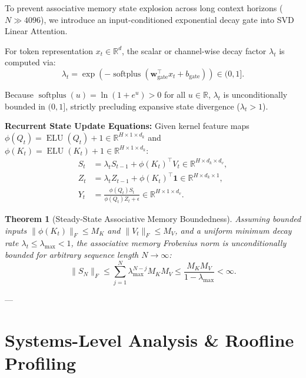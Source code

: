 \documentclass[10pt,twocolumn,letterpaper]{article}
\newtheorem{theorem}{Theorem}
\begin{document}
To prevent associative memory state explosion across long context horizons ($N \gg 4096$), we introduce an input-conditioned exponential decay gate into SVD Linear Attention.

For token representation $x_t \in \mathbb{R}^d$, the scalar or channel-wise decay factor $\lambda_t$ is computed via:
\begin{equation}
\label{eq:decay_gate}
\lambda_t = \exp\left(-\operatorname{softplus}\left(\mathbf{w}_{\text{gate}}^\top x_t + b_{\text{gate}}\right)\right) \in (0, 1].
\end{equation}

Because $\operatorname{softplus}(u) = \ln(1 + e^u) > 0$ for all $u \in \mathbb{R}$, $\lambda_t$ is unconditionally bounded in $(0, 1]$, strictly precluding expansive state divergence ($\lambda_t > 1$).

\textbf{Recurrent State Update Equations:}
Given kernel feature maps $\phi(Q_t) = \operatorname{ELU}(Q_t) + 1 \in \mathbb{R}^{H \times 1 \times d_k}$ and $\phi(K_t) = \operatorname{ELU}(K_t) + 1 \in \mathbb{R}^{H \times 1 \times d_k}$:
\begin{align}
S_t &= \lambda_t S_{t-1} + \phi(K_t)^\top V_t \in \mathbb{R}^{H \times d_k \times d_v}, \label{eq:state_S} \\
Z_t &= \lambda_t Z_{t-1} + \phi(K_t)^\top \mathbf{1} \in \mathbb{R}^{H \times d_k \times 1}, \label{eq:state_Z} \\
Y_t &= \frac{\phi(Q_t) S_t}{\phi(Q_t) Z_t + \epsilon} \in \mathbb{R}^{H \times 1 \times d_v}. \label{eq:output_Y}
\end{align}

\begin{theorem}[Steady-State Associative Memory Boundedness]
Assuming bounded inputs $\|\phi(K_t)\|_F \le M_K$ and $\|V_t\|_F \le M_V$, and a uniform minimum decay rate $\lambda_t \le \lambda_{\max} < 1$, the associative memory Frobenius norm is unconditionally bounded for arbitrary sequence length $N \to \infty$:
\begin{equation}
\|S_N\|_F \le \sum_{j=1}^N \lambda_{\max}^{N-j} M_K M_V \le \frac{M_K M_V}{1 - \lambda_{\max}} < \infty.
\end{equation}
\end{theorem}

---


\section{Systems-Level Analysis \& Roofline Profiling}
\label{sec:systems}
\end{document}
